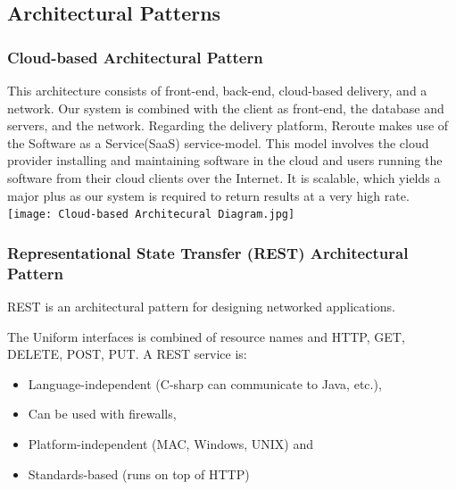 \documentclass[a4paper,10pt]{article}
\begin{document}
	\subsection{Architectural Patterns}
	\subsubsection{Cloud-based Architectural Pattern}
	This architecture consists of front-end, back-end, cloud-based delivery, and a network.
	Our system is combined with the client as front-end, the database and servers, and the network. 
	Regarding the delivery platform, Reroute makes use of the Software as a Service(SaaS) service-model. This model involves
	the cloud provider installing and maintaining software in the cloud and users running the software from their cloud clients
	over the Internet. It is scalable, which yields a major plus as our system is required to return results at a very high rate.\\
	
	\texttt{[image: Cloud-based Architecural Diagram.jpg]}\\

	\subsubsection{Representational State Transfer (REST) Architectural Pattern}
	REST is an architectural pattern for designing networked applications.

The Uniform interfaces is combined of resource names and HTTP, GET, DELETE, POST, PUT.
A REST service is:
\begin{itemize}
	\item Language-independent (C-sharp can communicate to Java, etc.),
	\item Can be used with firewalls,
	\item Platform-independent (MAC, Windows, UNIX) and
	\item Standards-based (runs on top of HTTP)
\end{itemize}
\end{document}

